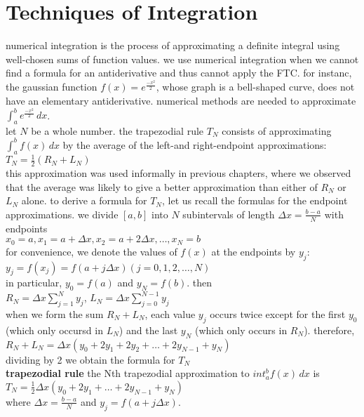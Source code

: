 \documentclass{article}
\begin{document}
\section*{Techniques of Integration}
numerical integration is the process of approximating a definite integral using well-chosen sums of function values. we use numerical integration when we cannot find a formula for an antiderivative and thus cannot apply the FTC. for instanc, the gaussian function $f(x) = e^{\frac{-x^2}{2}}$, whose graph is a bell-shaped curve, does not have an elementary antiderivative. numerical methods are needed to approximate $\int_{a}^{b}e^{\frac{-x^2}{2}}\,dx$.\\ let $N$ be a whole number. the trapezodial rule $T_N$ consists of approximating $\int_{a}^{b}f(x)\,dx$ by the average of the left-and right-endpoint approximations: $T_N = \frac{1}{2}(R_N + L_N)$\\ this approximation was used informally in previous chapters, where we observed that the average was likely to give a better approximation than either of $R_N$ or $L_N$ alone. to derive a formula for $T_N$, let us recall the formulas for the endpoint approximations. we divide $[a, b]$ into $N$ subintervals of length $\Delta x = \frac{b - a}{N}$ with endpoints\\ $x_0 = a, x_1 = a + \Delta x, x_2 = a + 2\Delta x, \ldots, x_N = b$\\ for convenience, we denote the values of $f(x)$ at the endpoints by $y_j$:\\ $y_j = f(x_j) = f(a + j\Delta x) (j = 0, 1, 2, \ldots, N)$\\ in particular, $y_0 = f(a)$ and $y_N = f(b)$. then\\$R_N = \Delta x\sum_{j=1}^{N}y_j$, $L_N = \Delta x\sum_{j=0}^{N-1}y_j$\\ when we form the sum $R_N + L_N$, each value $y_j$ occurs twice except for the first $y_0$ (which only occursd in $L_N$) and the last $y_N$ (which only occurs in $R_N$). therefore,\\ $R_N + L_N = \Delta x(y_0 + 2y_1 + 2y_2 + \ldots + 2y_{N-1} + y_N)$\\ dividing by 2 we obtain the formula for $T_N$\\

\textbf{trapezodial rule} the Nth trapezodial approximation to $int_{a}^{b}f(x)\,dx$ is\\
$T_N = \frac{1}{2}\Delta x(y_0 + 2y_1 + \ldots + 2y_{N-1} + y_N)$\\
where $\Delta x = \frac{b - a}{N}$ and $y_j = f(a + j\Delta x)$.\\
\end{document}
